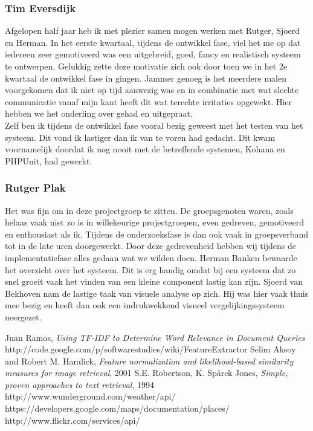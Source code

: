 \documentclass[a4paper,10pt]{article}
\begin{document}
		\subsubsection{Tim Eversdijk}
		Afgelopen half jaar heb ik met plezier samen mogen werken met Rutger, Sjoerd en Herman. In het eerste kwartaal, tijdens de ontwikkel fase, viel het me op dat iedereen zeer gemotiveerd was een uitgebreid, goed, fancy en realistisch systeem te ontwerpen. Gelukkig zette deze motivatie zich ook door toen we in het 2e kwartaal de ontwikkel fase in gingen. Jammer genoeg is het meerdere malen voorgekomen dat ik niet op tijd aanwezig was en in combinatie met wat slechte communicatie vanaf mijn kant heeft dit wat terechte irritaties opgewekt. Hier hebben we het onderling over gehad en uitgepraat.\\
		Zelf ben ik tijdens de ontwikkel fase vooral bezig geweest met het testen van het systeem. Dit vond ik lastiger dan ik van te voren had gedacht. Dit kwam voornamelijk doordat ik nog nooit met de betreffende systemen, Kohana en PHPUnit, had gewerkt.
		
		\subsubsection{Rutger Plak}
		Het was fijn om in deze projectgroep te zitten. De groepsgenoten waren, zoals helaas vaak niet zo is in willekeurige projectgroepen, even gedreven, gemotiveerd en enthousiast als ik. Tijdens de onderzoeksfase is dan ook vaak in groepsverband tot in de late uren doorgewerkt. Door deze gedrevenheid hebben wij tijdens de implementatiefase alles gedaan wat we wilden doen. Herman Banken bewaarde het overzicht over het systeem. Dit is erg handig omdat bij een systeem dat zo snel groeit vaak het vinden van een kleine component lastig kan zijn. Sjoerd van Bekhoven nam de lastige taak van visuele analyse op zich. Hij was hier vaak thuis mee bezig en heeft dan ook een indrukwekkend visueel vergelijkingssysteem neergezet.
		
\begin{thebibliography}{99}
 Juan Ramos, \textsl{Using TF-IDF to Determine Word Relevance in Document Queries}
 http://code.google.com/p/softwarestudies/wiki/FeatureExtractor
 Selim Aksoy and Robert M. Haralick, \textsl{Feature normalization and likelihood-based similarity measures for image retrieval}, 2001
 S.E. Robertson, K. Sp\"arck Jones, \textsl{Simple, proven approaches to text retrieval}, 1994
 http://www.wunderground.com/weather/api/
 https://developers.google.com/maps/documentation/places/
 http://www.flickr.com/services/api/
\end{thebibliography}		
\end{document}

